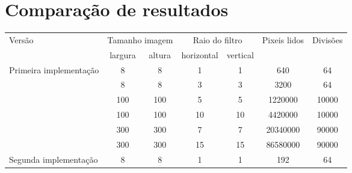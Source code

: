 \section{Comparação de resultados}

\begin{table}[H]
	\centering
	\begin{tabular}{ |l||c|c||c|c||c|c|  }
		\hline
		\multirow{2}{*}{Versão}                 & \multicolumn{2}{c||}{Tamanho imagem} & \multicolumn{2}{c||}{Raio do filtro} & \multirow{2}{*}{Pixeis lidos} & \multirow{2}{*}{Divisões}                    \\
		\cline{2-5}
		                                        & largura                              & altura                               & horizontal                    & vertical                  &          &       \\
		\hline
		\multirow{6}{*}{Primeira implementação} & 8                                    & 8                                    & 1                             & 1                         & 640      & 64    \\
		\cline{2-7}
		                                        & 8                                    & 8                                    & 3                             & 3                         & 3200     & 64    \\
		\cline{2-7}
		                                        & 100                                  & 100                                  & 5                             & 5                         & 1220000  & 10000 \\
		\cline{2-7}
		                                        & 100                                  & 100                                  & 10                            & 10                        & 4420000  & 10000 \\
		\cline{2-7}
		                                        & 300                                  & 300                                  & 7                             & 7                         & 20340000 & 90000 \\
		\cline{2-7}
		                                        & 300                                  & 300                                  & 15                            & 15                        & 86580000 & 90000 \\
		\hline
		\multirow{6}{*}{Segunda implementação}  & 8                                    & 8                                    & 1                             & 1                         & 192      & 64    \\

\end{tabular}
\end{table}
